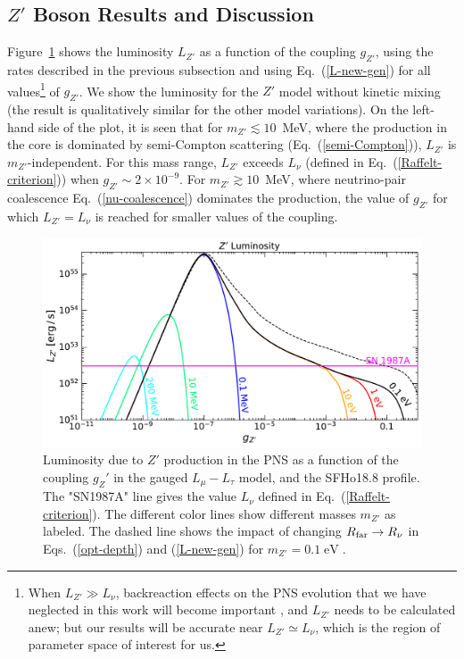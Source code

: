 \documentclass[11pt]{article}
\DeclareMathOperator{\ev}{eV} \DeclareMathOperator{\kev}{keV} \DeclareMathOperator{\mev}{MeV} \DeclareMathOperator{\gev}{GeV} \DeclareMathOperator{\tev}{TeV}  \DeclareMathOperator{\pev}{PeV} \DeclareMathOperator{\cm}{cm} \DeclareMathOperator{\barn}{barn} \DeclareMathOperator{\g}{g} \DeclareMathOperator{\km}{km} \DeclareMathOperator{\pb}{pb} \DeclareMathOperator{\s}{s} \DeclareMathOperator{\yr}{yr}\DeclareMathOperator{\gyr}{Gyr} \DeclareMathOperator{\kg}{kg} \DeclareMathOperator{\mpc}{Mpc} \DeclareMathOperator{\few}{few} \DeclareMathOperator{\kel}{K}
\newcommand{\tenx}[1]{\times 10^{#1}}
\newcommand{\Eq}[1]{Eq.~(\ref{#1})} \newcommand{\Eqs}[2]{Eqs.~(\ref{#1}) and (\ref{#2})} \newcommand{\Eqm}[2]{Eqs.~(\ref{#1}) through (\ref{#2})}
\begin{document}
\subsection{$Z'$ Boson Results and Discussion}
Figure~\ref{fig:lmultaulum} shows the luminosity $L_{Z'}$ as a function of the coupling $g_{Z'}$, using the rates described in the previous subsection and using \Eq{L-new-gen} for all values\footnote{\footnotesize{When $L_{Z'} \gg L_\nu$, backreaction effects on the PNS evolution that we have neglected in this work will become important \cite{Burrows:1990pk, Chang:2018rso}, and $L_{Z'}$ needs to be calculated anew; but our results will be accurate near $L_{Z'} \simeq L_\nu$, which is the region of parameter space of interest for us.}} of $g_{Z'}$. We show the luminosity for the $Z'$ model without kinetic mixing (the result is qualitatively similar for the other model variations). On the left-hand side of the plot, it is seen that for $m_{Z'} \lesssim 10 $~MeV, where the production in the core is dominated by semi-Compton scattering (\Eq{semi-Compton}), $L_{Z'}$ is $m_{Z'}$-independent. For this mass range, $L_{Z'}$ exceeds $L_\nu$ (defined in Eq.~(\ref{Raffelt-criterion})) when $g_{Z'} \sim 2\tenx{-9}$. For $m_{Z'} \gtrsim 10 $~MeV, where neutrino-pair coalescence \Eq{nu-coalescence} dominates the production, the value of $g_{Z'}$ for which $L_{Z'}=L_\nu$ is reached for smaller values of the coupling. 
\begin{figure}[t!] 
\centering
  \includegraphics[width=\columnwidth]{Zp_L_vs_g} \caption{Luminosity due to $Z'$ production in the PNS as a function of the coupling $g_Z'$ in the gauged $L_{\mu}-L_{\tau}$ model, and the SFHo18.8 profile. The "SN1987A" line gives the value $L_\nu $ defined in Eq.~(\ref{Raffelt-criterion}). The different color lines show different masses $m_{Z'}$ as labeled. The dashed line shows the impact of changing $R_{\rm far} \to R_\nu$ in \Eqs{opt-depth}{L-new-gen} for $m_{Z'}=0.1\ev$. }
  \label{fig:lmultaulum}
\end{figure}
\end{document}
